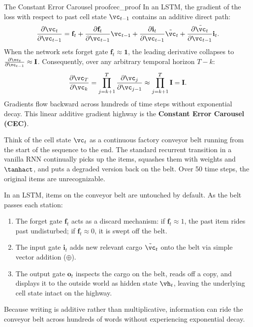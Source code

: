 \documentclass[../../main.tex]{subfiles}
\begin{document}
\begin{theorem}{The Constant Error Carousel proof}{cec_proof}
In an LSTM, the gradient of the loss with respect to past cell state $\vc_{t-1}$ contains an additive direct path:
\begin{equation}
\label{eq:cec_gradient}
\frac{\partial \vc_t}{\partial \vc_{t-1}} = \mathbf{f}_t + \frac{\partial \mathbf{f}_t}{\partial \vc_{t-1}} \vc_{t-1} + \frac{\partial \mathbf{i}_t}{\partial \vc_{t-1}} \tilde{\vc}_t + \frac{\partial \tilde{\vc}_t}{\partial \vc_{t-1}} \mathbf{i}_t.
\end{equation}
When the network sets forget gate $\mathbf{f}_t \approx \mathbf{1}$, the leading derivative collapses to $\frac{\partial \vc_t}{\partial \vc_{t-1}} \approx \mathbf{I}$. Consequently, over any arbitrary temporal horizon $T - k$:
\begin{equation}
\label{eq:cec_chain}
\frac{\partial \vc_T}{\partial \vc_k} = \prod_{j=k+1}^T \frac{\partial \vc_j}{\partial \vc_{j-1}} \approx \prod_{j=k+1}^T \mathbf{I} = \mathbf{I}.
\end{equation}
Gradients flow backward across hundreds of time steps without exponential decay. This linear additive gradient highway is the \textbf{Constant Error Carousel (CEC)}.
\end{theorem}

\begin{intuition}
Think of the cell state $\vc_t$ as a continuous factory conveyor belt running from the start of the sequence to the end. The standard recurrent transition in a vanilla RNN continually picks up the items, squashes them with weights and $\tanhact$, and puts a degraded version back on the belt. Over 50 time steps, the original items are unrecognizable.

In an LSTM, items on the conveyor belt are untouched by default. As the belt passes each station:
\begin{enumerate}
    \item The forget gate $\mathbf{f}_t$ acts as a discard mechanism: if $\mathbf{f}_t \approx 1$, the past item rides past undisturbed; if $\mathbf{f}_t \approx 0$, it is swept off the belt.
    \item The input gate $\mathbf{i}_t$ adds new relevant cargo $\tilde{\vc}_t$ onto the belt via simple vector addition ($\oplus$).
    \item The output gate $\mathbf{o}_t$ inspects the cargo on the belt, reads off a copy, and displays it to the outside world as hidden state $\vh_t$, leaving the underlying cell state intact on the highway.
\end{enumerate}
Because writing is additive rather than multiplicative, information can ride the conveyor belt across hundreds of words without experiencing exponential decay.
\end{intuition}
\end{document}
